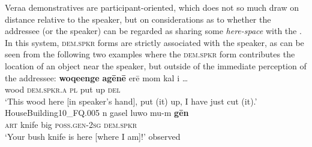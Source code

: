 \documentclass[output=paper
,modfonts
,nonflat]{langsci/langscibook}
\begin{document}
Vera{\textquotesingle}a demonstratives are participant-oriented, which does not so much draw on distance relative to the speaker, but on considerations as to whether the addressee (or the speaker) can be regarded as sharing some \textit{here-space} with the . In this system, \textsc{dem.spkr} forms are strictly associated with the speaker, as can be seen from the following two examples where the \textsc{dem.spkr} form contributes the location of an object near the speaker, but outside of the immediate perception of the addressee:  
\ea \label{ex13}
\gll	\textbf{woqe{\textquotesingle}enge} 	\textbf{ag\=en\=e} 		{\textquotesingle}er\=e 	mom 	kal 	{\textquotesingle}i 			{\ob}\dots{\cb}	\\
		wood			\textsc{dem.spkr.a}	\textsc{pl}		put	up	\textsc{del}					\\
\glt	`This wood here [in speaker's hand], put (it) up, I have just cut (it).'\\							\hfill{HouseBuilding10\_FQ.005}
\z
\ea \label{ex14}
\gll 	n		gasel	luwo	mu-m			\textbf{g\=en}	\\
		\textsc{art}	knife	big		\textsc{poss.gen-2sg}	\textsc{dem.spkr}		\\
\glt		`Your bush knife is here [where I am]!'			\hfill{observed}
\z
\end{document}
